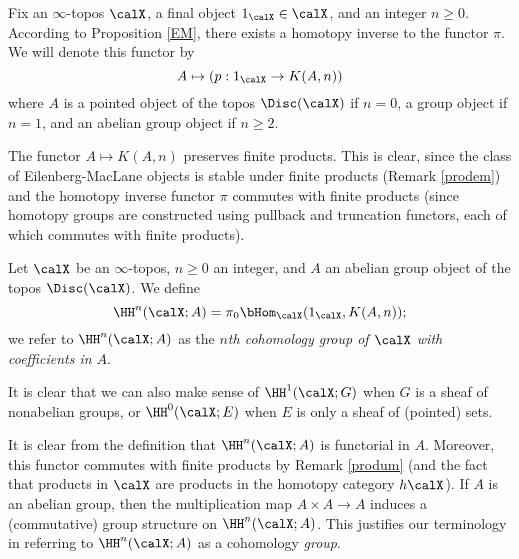 Fix an $\infty$-topos $\calX$, a final object $1_{\calX} \in \calX$, and an integer $n \geq 0$. According to Proposition \ref{EM}, there exists a homotopy inverse to the functor $\pi$. We will denote this functor by
$$ A \mapsto (p: 1_{\calX} \rightarrow K(A,n) )$$
where $A$ is a pointed object of the topos $\Disc(\calX)$ if $n = 0$, a group object
if $n =1$, and an abelian group object if $n \geq 2$.

\begin{remark}\label{produm}
The functor $A \mapsto K(A,n)$ preserves finite products. This is clear, since the class of Eilenberg-MacLane objects is stable under finite products (Remark \ref{prodem}) and the homotopy inverse functor $\pi$ commutes with finite products (since homotopy groups are constructed using pullback and truncation functors, each of which commutes with finite products).
\end{remark}

\begin{definition}
Let $\calX$ be an $\infty$-topos, $n \geq 0$ an integer, and $A$ an abelian group object of the topos $\Disc(\calX)$.
We define 
$$ \HH^{n}(\calX; A) = \pi_0 \bHom_{\calX}( 1_{\calX}, K(A,n) ); $$
we refer to $\HH^n(\calX; A)$ as the {\it $n$th cohomology group of $\calX$ with coefficients in $A$}.
\end{definition}

\begin{remark}
It is clear that we can also make sense of $\HH^{1}(\calX; G)$ when $G$ is a sheaf of nonabelian groups, or $\HH^0(\calX; E)$ when $E$ is only a sheaf of (pointed) sets.
\end{remark}

\begin{remark}
It is clear from the definition that $\HH^{n}(\calX; A)$ is functorial in $A$. Moreover, this functor
commutes with finite products by Remark \ref{produm} (and the fact that products in $\calX$
are products in the homotopy category $h \calX$). If $A$ is an abelian group, then the multiplication
map $A \times A \rightarrow A$ induces a (commutative) group structure on $\HH^{n}(\calX;A)$. This justifies our terminology in referring to $\HH^{n}(\calX;A)$ as a cohomology {\em group}.
\end{remark}

